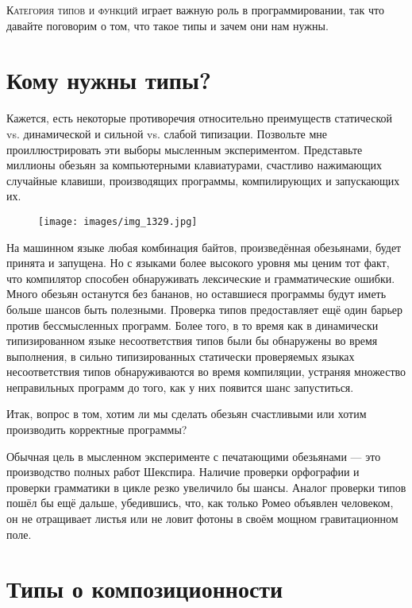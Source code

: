 
\lettrine[lhang=0.17]{К}{атегория типов и функций} играет важную роль в
программировании, так что давайте поговорим о том, что такое типы и зачем они нам нужны.

\section{Кому нужны типы?}

Кажется, есть некоторые противоречия относительно преимуществ статической vs.
динамической и сильной vs. слабой типизации. Позвольте мне проиллюстрировать эти выборы
мысленным экспериментом. Представьте миллионы обезьян за компьютерными клавиатурами,
счастливо нажимающих случайные клавиши, производящих программы, компилирующих и запускающих
их.

\begin{figure}[H]
  \centering
  \texttt{[image: images/img\_1329.jpg]}
\end{figure}

\noindent
На машинном языке любая комбинация байтов, произведённая обезьянами,
будет принята и запущена. Но с языками более высокого уровня мы
ценим тот факт, что компилятор способен обнаруживать лексические и
грамматические ошибки. Много обезьян останутся без бананов, но
оставшиеся программы будут иметь больше шансов быть полезными. Проверка типов
предоставляет ещё один барьер против бессмысленных программ.
Более того, в то время как в динамически типизированном языке несоответствия типов были бы
обнаружены во время выполнения, в сильно типизированных статически проверяемых языках
несоответствия типов обнаруживаются во время компиляции, устраняя множество
неправильных программ до того, как у них появится шанс запуститься.

Итак, вопрос в том, хотим ли мы сделать обезьян счастливыми или хотим
производить корректные программы?

Обычная цель в мысленном эксперименте с печатающими обезьянами --- это
производство полных работ Шекспира. Наличие проверки орфографии
и проверки грамматики в цикле резко увеличило бы шансы.
Аналог проверки типов пошёл бы ещё дальше, убедившись, что,
как только Ромео объявлен человеком, он не отращивает листья или не ловит
фотоны в своём мощном гравитационном поле.

\section{Типы о композиционности}

